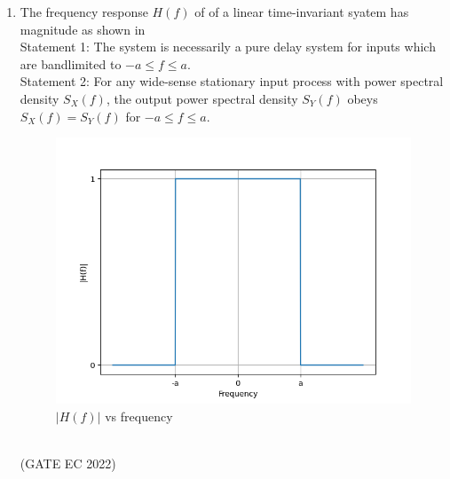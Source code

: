 \begin{enumerate}[label=\thechapter.\arabic*,ref=\thechapter.\theenumi]
\item The frequency response $H(f)$ of of a linear time-invariant syatem has magnitude as shown in \\
Statement 1: The system is necessarily a pure delay system for inputs which are bandlimited to $-a \leq f \leq a$.\\
Statement 2: For any wide-sense stationary input process with power spectral density $S_X(f)$, the output power spectral density $S_Y(f)$ obeys $S_X(f)=S_Y(f)$ for $-a \leq f \leq a$.\\
\begin{figure}[!ht]
\centering
\includegraphics[width=\columnwidth]{gate/EC/2022/23/figs/figure.png}
\caption{$|H(f)|$ vs frequency}
\label{fig:23.2022,1}
\end{figure}\\

\hfill (GATE EC 2022)
\end{enumerate}
